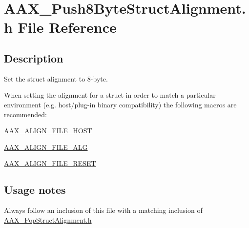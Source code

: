 \hypertarget{a00286}{}\section{A\+A\+X\+\_\+\+Push8\+Byte\+Struct\+Alignment.\+h File Reference}
\label{a00286}


\subsection{Description}
Set the struct alignment to 8-\/byte. 

When setting the alignment for a struct in order to match a particular environment (e.\+g. host/plug-\/in binary compatibility) the following macros are recommended\+: \begin{DoxyItemize}
\item \hyperlink{a00149_acbef7ed7d077bc9812cb56417e1ad325}{A\+A\+X\+\_\+\+A\+L\+I\+G\+N\+\_\+\+F\+I\+L\+E\+\_\+\+H\+O\+S\+T} \item \hyperlink{a00149_a8fbeac3c5db5ac694e85a021ed74dc9e}{A\+A\+X\+\_\+\+A\+L\+I\+G\+N\+\_\+\+F\+I\+L\+E\+\_\+\+A\+L\+G} \item \hyperlink{a00149_a8aaaefcc3d87025e84d5ccb99b650a87}{A\+A\+X\+\_\+\+A\+L\+I\+G\+N\+\_\+\+F\+I\+L\+E\+\_\+\+R\+E\+S\+E\+T}\end{DoxyItemize}
\hypertarget{a00286_AAX_Push8ByteStructAlignment_usagenotes}{}\subsection{Usage notes}\label{a00286_AAX_Push8ByteStructAlignment_usagenotes}
\begin{DoxyItemize}
\item Always follow an inclusion of this file with a matching inclusion of \hyperlink{a00281}{A\+A\+X\+\_\+\+Pop\+Struct\+Alignment.\+h}\end{DoxyItemize}
